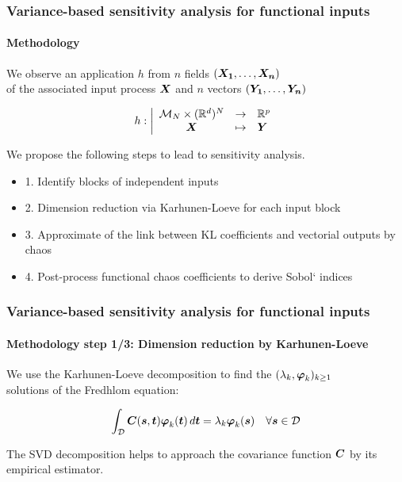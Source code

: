 \documentclass[aspectratio=169]{beamer}
\date[]{UserDay \#15, 10 June 2022, EDF Lab Saclay}
\begin{document}

\begin{frame}
\frametitle{Variance-based sensitivity analysis for functional inputs}

\framesubtitle{Methodology}

We observe an application $h$ from $n$ fields $({{\mathbf{\boldsymbol{{{\mathbf{\boldsymbol{{X_1}}}}}}}}}, \dots, {{\mathbf{\boldsymbol{{{\mathbf{\boldsymbol{{X_n}}}}}}}}})$ \\
of the associated input process ${{\mathbf{\boldsymbol{{{\mathbf{\boldsymbol{{X}}}}}}}}}$ and $n$ vectors $({\mathbf{\boldsymbol{{Y_1}}}},\dots,{\mathbf{\boldsymbol{{Y_n}}}})$

$$
h: \left|
  \begin{array}{ccl}
      {\mathcal M}_N \times (\mathbb{R}^d)^N & \rightarrow & \mathbb{R}^p \\
      {{\mathbf{\boldsymbol{{{\mathbf{\boldsymbol{{X}}}}}}}}} & \mapsto & {\mathbf{\boldsymbol{{Y}}}}
  \end{array}
\right.
$$

\vspace{10mm}

We propose the following steps to lead to sensitivity analysis.

\begin{itemize}
\item 1. Identify blocks of independent inputs
\item 2. Dimension reduction via Karhunen-Loeve for each input block
\item 3. Approximate of the link between KL coefficients and vectorial outputs by chaos
\item 4. Post-process functional chaos coefficients to derive Sobol` indices
\end{itemize}

\end{frame}


% 
% 
% 
% 


\begin{frame}
\frametitle{Variance-based sensitivity analysis for functional inputs}

\framesubtitle{Methodology step 1/3: Dimension reduction by Karhunen-Loeve}

We use the Karhunen-Loeve decomposition to find the $(\lambda_k, {\mathbf{\boldsymbol{{\varphi}}}}_k)_{k \geq 1}$ \\
solutions of the Fredhlom equation:

$$
\int_{{\mathcal D}} {{\mathbf{\boldsymbol{{{\mathbf{\boldsymbol{{C}}}}}}}}}({\mathbf{\boldsymbol{{s}}}},{\mathbf{\boldsymbol{{t}}}}) {\mathbf{\boldsymbol{{\varphi}}}}_k({\mathbf{\boldsymbol{{t}}}})\,  d{\mathbf{\boldsymbol{{t}}}} = \lambda_k  {\mathbf{\boldsymbol{{\varphi}}}}_k({\mathbf{\boldsymbol{{s}}}}) \quad \forall {\mathbf{\boldsymbol{{s}}}} \in {\mathcal D}
$$

The SVD decomposition helps to approach the covariance function ${{\mathbf{\boldsymbol{{{\mathbf{\boldsymbol{{C}}}}}}}}}$ by its empirical estimator.

\end{frame}
\end{document}
